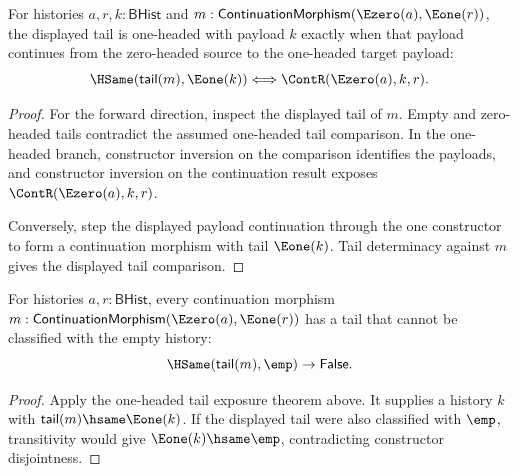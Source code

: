 \begin{theorem}
\label{thm:category-continuation-morphism-e0-source-e1-target-tail-e1-iff}
For histories $a,r,k:\mathsf{BHist}$ and
$m:\mathsf{ContinuationMorphism}(\Ezero(a),\Eone(r))$, the displayed tail is
one-headed with payload $k$ exactly when that payload continues from the
zero-headed source to the one-headed target payload:
$$
\HSame(\mathsf{tail}(m),\Eone(k))
\Longleftrightarrow
\ContR(\Ezero(a),k,r).
$$
\end{theorem}
\begin{proof}
For the forward direction, inspect the displayed tail of $m$. Empty and
zero-headed tails contradict the assumed one-headed tail comparison. In the
one-headed branch, constructor inversion on the comparison identifies the
payloads, and constructor inversion on the continuation result exposes
$\ContR(\Ezero(a),k,r)$.

Conversely, step the displayed payload continuation through the one constructor
to form a continuation morphism with tail $\Eone(k)$. Tail determinacy against
$m$ gives the displayed tail comparison.
\end{proof}

\begin{theorem}
\label{thm:continuation-morphism-e0-source-e1-target-tail-not-empty}
For histories $a,r:\mathsf{BHist}$, every continuation morphism
$m:\mathsf{ContinuationMorphism}(\Ezero(a),\Eone(r))$ has a tail that cannot be
classified with the empty history:
$$
\HSame(\mathsf{tail}(m),\emp)\to\mathsf{False}.
$$
\end{theorem}
\begin{proof}
Apply the one-headed tail exposure theorem above. It supplies a history $k$
with $\mathsf{tail}(m)\hsame\Eone(k)$. If the displayed tail were also
classified with $\emp$, transitivity would give $\Eone(k)\hsame\emp$,
contradicting constructor disjointness.
\end{proof}

